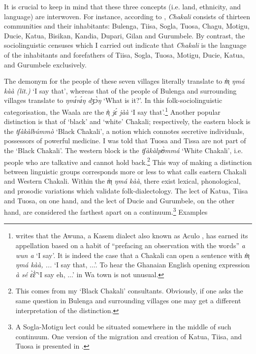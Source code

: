  
It is crucial to keep in mind that these three concepts (i.e. land, 
ethnicity, and language) are interwoven.   For instance, according to 
\citet{Daan94},  {\it Chakali}  consists of  thirteen communities 
and 
their inhabitants:  Bulenga, Tiisa, Sogla, Tuosa, Chagu, Motigu, Ducie, Katua, 
Bisikan, Kandia, Dupari, Gilan and Gurumbele.  By contrast, the 
sociolinguistic 
censuses which I carried out indicate that {\it Chakali} is the 
language 
of the inhabitants and forefathers of  Tiisa, Sogla, Tuosa,  Motigu, Ducie, 
Katua, and  Gurumbele exclusively.


The demonym for the people of these seven villages literally 
translate to  
{\it m̩̀ ŋmá kàà} {\it (lit.)}   `I say that',  whereas that of  the 
people 
of Bulenga and surrounding villages translate to   {\it ŋmɪ́nɪ́ŋ dʒɔ̀ŋ}  `What 
is it?'.   In this folk-sociolinguistic categorisation, the Waala are the {\it 
ǹ̩ jɛ́ jàà} `I say that'.\footnote{\citet[525]{Ratt32b} writes that the 
Awuna,  a Kasem dialect also known as Aculo \citep[147]{Nade89},  has earned 
its 
appellation based on a habit of  ``prefacing an observation with the words''  
{\it a wun a} `I say'. It is indeed the case that a Chakali  can open a sentence 
with {\it m̩̀ ŋmá kàà, ...}  `I say that, ...'. To hear the  Ghanaian 
English opening 
expression {\it à sé ɛ̃̀ɛ̃̀}  `I say eh, ...'   in Wa town is not 
unusual.}   Another popular distinction  is that of `black' and `white' 
Chakali;  respectively, the eastern block is the {\it tʃàkàlbúmmò} `Black 
Chakali',  a notion which connotes  secretive individuals, possessors of 
powerful medicine. I was told that Tuosa and Tissa are not part of the `Black 
Chakali'.   The western block is  the   {\it tʃàkàlpʊ̀mmá}  `White Chakali', 
i.e. people who are talkative and cannot hold back.\footnote{This comes from 
my 
`Black Chakali' consultants. Obviously, if one asks the same question in Bulenga 
and surrounding villages one may get a different interpretation of the 
distinction.}  This way of making a distinction 
between linguistic groups corresponds more or less to what \citet[2-3]{Good54} 
calls eastern Chakali and Western Chakali. Within the 
{\it m̩̀ ŋmá kàà}, there 
exist lexical, phonological, and prosodic variations which validate 
folk-dialectology. The lect of Katua, Tiisa and Tuosa,  on one hand, and the 
lect of Ducie and Gurumbele, on the other hand,  are considered the farthest 
apart on a continuum.\footnote{A Sogla-Motigu lect   could be situated somewhere 
in the middle of such continuum. One version of the migration and creation of 
Katua, Tiisa,  and Tuosa is presented in \citet[74-82]{Sali08}.} Examples 
